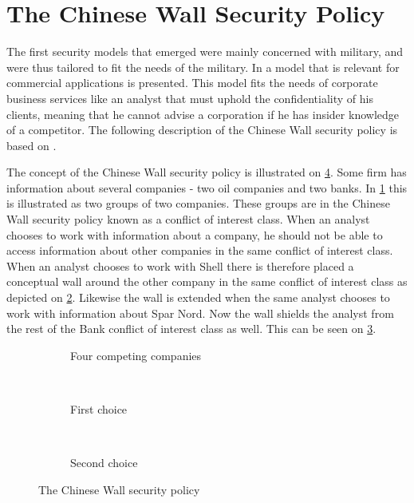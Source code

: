 \section{The Chinese Wall Security Policy}
The first security models that emerged were mainly concerned with military, and were thus tailored to fit the needs of the military. 
In \citet{brewer1989chinese} a model that is relevant for commercial applications is presented.
This model fits the needs of corporate business services like an analyst that must uphold the confidentiality of his clients, meaning that he cannot advise a corporation if he has insider knowledge of a competitor.
The following description of the Chinese Wall security policy is based on \citet{brewer1989chinese}.

The concept of the Chinese Wall security policy is illustrated on \cref{chinese:illu}.
Some firm has information about several companies - two oil companies and two banks.
In \cref{chinese:situation} this is illustrated as two groups of two companies.
These groups are in the Chinese Wall security policy known as a conflict of interest class.
When an analyst chooses to work with information about a company, he should not be able to access information about other companies in the same conflict of interest class.
When an analyst chooses to work with Shell there is therefore placed a conceptual wall around the other company in the same conflict of interest class as depicted on \cref{chinese:choice1}.
Likewise the wall is extended when the same analyst chooses to work with information about Spar Nord.
Now the wall shields the analyst from the rest of the Bank conflict of interest class as well.
This can be seen on \cref{chinese:choice2}.

\begin{figure}[H]
\centering
    \begin{subfigure}[t]{0.3\textwidth}
        \resizebox{\linewidth}{!}{}
        \caption{Four competing companies}
        \label{chinese:situation}
    \end{subfigure}
    ~
    \begin{subfigure}[t]{0.3\textwidth}
        \resizebox{\linewidth}{!}{}
        \caption{First choice}
        \label{chinese:choice1}
    \end{subfigure}
    ~
    \begin{subfigure}[t]{0.3\textwidth}
        \resizebox{\linewidth}{!}{}
        \caption{Second choice}
        \label{chinese:choice2}
    \end{subfigure}
    \caption{The Chinese Wall security policy}\label{chinese:illu}
\end{figure}


